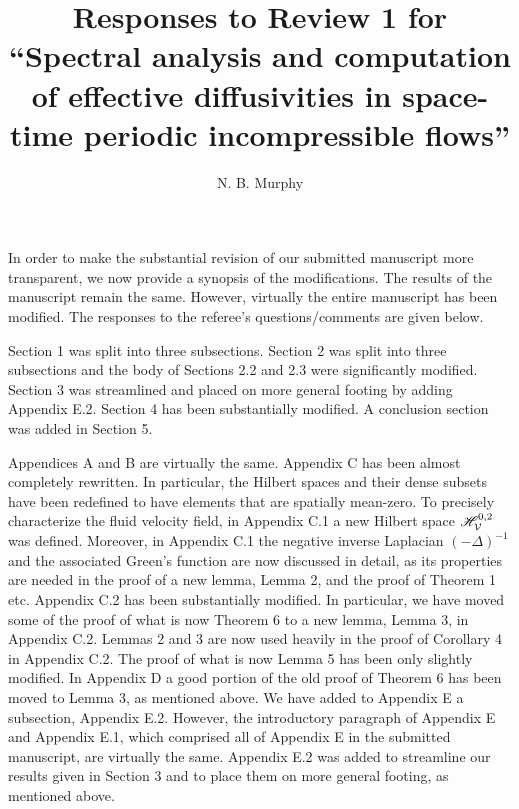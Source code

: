 \documentclass[amsa]{article}
\begin{document}
\title{Responses to Review 1 for\\
  ``Spectral analysis and computation\\
  of effective diffusivities in 
  space-time periodic incompressible flows''}
\author{N. B. Murphy}

\maketitle





In order to make the substantial revision of our submitted manuscript
more transparent, we now provide a synopsis of the modifications. The 
results of the manuscript remain the same. However, virtually the
entire manuscript has been modified. The responses to the referee's
questions/comments are given below.   


Section 1 was split into three subsections. Section 2 was split into
three subsections and the body of Sections 2.2 and 2.3 were
significantly modified. Section 3 was streamlined and placed on more
general footing by adding Appendix E.2. Section 4 has been
substantially modified. A conclusion section was added in Section
5.


Appendices A and B are virtually the same.
Appendix C has been
almost completely rewritten. In particular, the Hilbert spaces and
their dense subsets have been redefined to have elements that are
spatially mean-zero. To precisely characterize the fluid velocity
field, in Appendix C.1 a new Hilbert space $\mathscr{H}_{\mathcal{V}}^{0,2}$ was
defined. Moreover, in Appendix C.1 the negative inverse Laplacian
$(-\Delta)^{-1}$ and the associated Green's function are now discussed in
detail, as its properties are needed 
in the proof of a new lemma, Lemma 2, and the proof of Theorem 1
etc. Appendix C.2 has been substantially modified. In particular, we
have moved some of the proof of what is now Theorem 6 to a new lemma,
Lemma 3, in Appendix C.2. Lemmas 2 and 3 are now used heavily in the
proof of Corollary 4 in Appendix C.2. The proof of what is now Lemma 5 
has been only slightly modified. In Appendix D a good portion of the
old proof of Theorem 6 has been moved to Lemma 3, as mentioned
above. We have added to Appendix E a subsection, Appendix
E.2. However, the introductory paragraph of Appendix E and Appendix
E.1, which comprised all of Appendix E in the submitted manuscript,
are virtually the same. Appendix E.2 was added to streamline our
results given in Section 3 and to place them on more general footing,
as mentioned above.   
\end{document}
